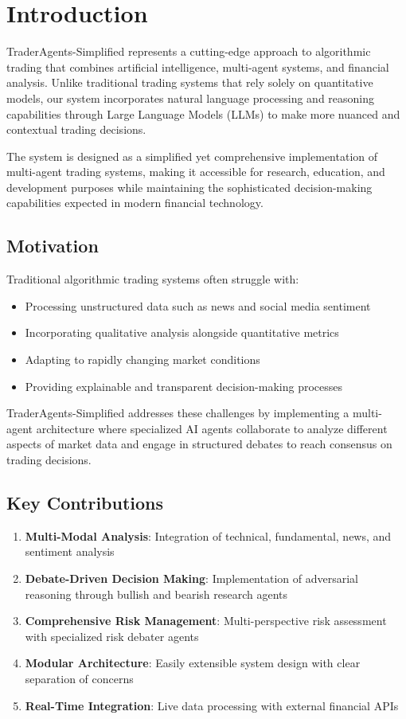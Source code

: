 \documentclass[11pt,a4paper]{article}
\begin{document}
\section{Introduction}

TraderAgents-Simplified represents a cutting-edge approach to algorithmic trading that combines artificial intelligence, multi-agent systems, and financial analysis. Unlike traditional trading systems that rely solely on quantitative models, our system incorporates natural language processing and reasoning capabilities through Large Language Models (LLMs) to make more nuanced and contextual trading decisions.

The system is designed as a simplified yet comprehensive implementation of multi-agent trading systems, making it accessible for research, education, and development purposes while maintaining the sophisticated decision-making capabilities expected in modern financial technology.

\subsection{Motivation}

Traditional algorithmic trading systems often struggle with:
\begin{itemize}
    \item Processing unstructured data such as news and social media sentiment
    \item Incorporating qualitative analysis alongside quantitative metrics
    \item Adapting to rapidly changing market conditions
    \item Providing explainable and transparent decision-making processes
\end{itemize}

TraderAgents-Simplified addresses these challenges by implementing a multi-agent architecture where specialized AI agents collaborate to analyze different aspects of market data and engage in structured debates to reach consensus on trading decisions.

\subsection{Key Contributions}

\begin{enumerate}
    \item \textbf{Multi-Modal Analysis}: Integration of technical, fundamental, news, and sentiment analysis
    \item \textbf{Debate-Driven Decision Making}: Implementation of adversarial reasoning through bullish and bearish research agents
    \item \textbf{Comprehensive Risk Management}: Multi-perspective risk assessment with specialized risk debater agents
    \item \textbf{Modular Architecture}: Easily extensible system design with clear separation of concerns
    \item \textbf{Real-Time Integration}: Live data processing with external financial APIs
\end{enumerate}
\end{document}
